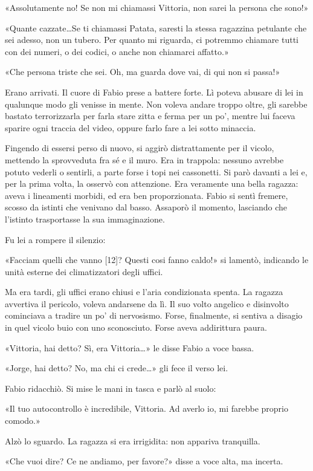 «Assolutamente no! Se non mi chiamassi Vittoria, non sarei la persona che sono!»

«Quante cazzate\ldots Se ti chiamassi Patata, saresti la stessa ragazzina petulante che sei adesso, non un tubero. Per quanto mi riguarda, ci potremmo chiamare tutti con dei numeri, o dei codici, o anche non chiamarci affatto.»

«Che persona triste che sei. Oh, ma guarda dove vai, di qui non si passa!»

Erano arrivati. Il cuore di Fabio prese a battere forte. Lì poteva abusare di lei in qualunque modo gli venisse in mente. Non voleva andare troppo oltre, gli sarebbe bastato terrorizzarla per farla stare zitta e ferma per un po', mentre lui faceva sparire ogni traccia del video, oppure farlo fare a lei sotto minaccia.

Fingendo di essersi perso di nuovo, si aggirò distrattamente per il vicolo, mettendo la sprovveduta fra sé e il muro. Era in trappola: nessuno avrebbe potuto vederli o sentirli, a parte forse i topi nei cassonetti. Si parò davanti a lei e, per la prima volta, la osservò con attenzione. Era veramente una bella ragazza: aveva i lineamenti morbidi, ed era ben proporzionata. Fabio si sentì fremere, scosso da istinti che venivano dal basso. Assaporò il momento, lasciando che l'istinto trasportasse la sua immaginazione.

Fu lei a rompere il silenzio:

«Facciam quelli che vanno [12]? Questi cosi fanno caldo!» si lamentò, indicando le unità esterne dei climatizzatori degli uffici.

Ma era tardi, gli uffici erano chiusi e l'aria condizionata spenta. La ragazza avvertiva il pericolo, voleva andarsene da lì. Il suo volto angelico e disinvolto cominciava a tradire un po' di nervosismo. Forse, finalmente, si sentiva a disagio in quel vicolo buio con uno sconosciuto. Forse aveva addirittura paura.

«Vittoria, hai detto? Sì, era Vittoria\ldots» le disse Fabio a voce bassa.

«Jorge, hai detto? No, ma chi ci crede\ldots» gli fece il verso lei.

Fabio ridacchiò. Si mise le mani in tasca e parlò al suolo:

«Il tuo autocontrollo è incredibile, Vittoria. Ad averlo io, mi farebbe proprio comodo.»

Alzò lo sguardo. La ragazza si era irrigidita: non appariva tranquilla.

«Che vuoi dire? Ce ne andiamo, per favore?» disse a voce alta, ma incerta.

